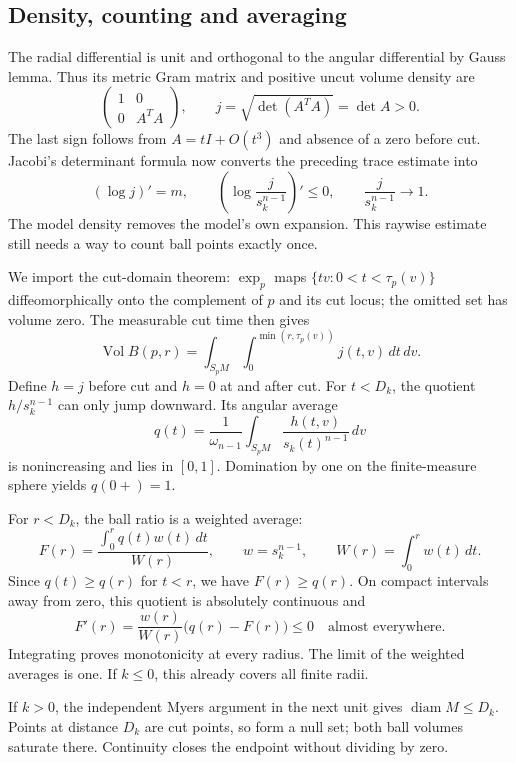 \documentclass[12pt,reqno]{amsart}
\begin{document}
\begin{samepage}
\begin{theorem}
\label{thm:volume}

\end{theorem}
\end{samepage}

\subsection*{Density, counting and averaging}
The radial differential is unit and orthogonal to the angular differential by Gauss lemma. Thus its metric Gram matrix and positive uncut volume density are
\[
\begin{pmatrix}1&0\\0&A^TA\end{pmatrix},
\qquad j=\sqrt{\det(A^TA)}=\det A>0.
\]
The last sign follows from \(A=tI+O(t^3)\) and absence of a zero before cut. Jacobi's determinant formula now converts the preceding trace estimate into
\[
(\log j)'=m,\qquad
\left(\log\frac{j}{s_k^{n-1}}\right)'\le0,
\qquad \frac{j}{s_k^{n-1}}\longrightarrow1.
\]
The model density removes the model's own expansion. This raywise estimate still needs a way to count ball points exactly once.

We import the cut-domain theorem: \(\exp_p\) maps \(\{tv:0<t<\tau_p(v)\}\) diffeomorphically onto the complement of \(p\) and its cut locus; the omitted set has volume zero. The measurable cut time then gives
\[
\operatorname{Vol}B(p,r)=\int_{S_pM}\int_0^{\min(r,\tau_p(v))}j(t,v)\,dt\,dv.
\]
Define \(h=j\) before cut and \(h=0\) at and after cut. For \(t<D_k\), the quotient \(h/s_k^{n-1}\) can only jump downward. Its angular average
\[
q(t)=\frac1{\omega_{n-1}}\int_{S_pM}\frac{h(t,v)}{s_k(t)^{n-1}}\,dv
\]
is nonincreasing and lies in \([0,1]\). Domination by one on the finite-measure sphere yields \(q(0+)=1\).

For \(r<D_k\), the ball ratio is a weighted average:
\[
F(r)=\frac{\int_0^r q(t)w(t)\,dt}{W(r)},
\qquad w=s_k^{n-1},\qquad W(r)=\int_0^r w(t)\,dt.
\]
Since \(q(t)\ge q(r)\) for \(t<r\), we have \(F(r)\ge q(r)\). On compact intervals away from zero, this quotient is absolutely continuous and
\[
F'(r)=\frac{w(r)}{W(r)}\bigl(q(r)-F(r)\bigr)\le0
\quad\text{almost everywhere}.
\]
Integrating proves monotonicity at every radius. The limit of the weighted averages is one. If \(k\le0\), this already covers all finite radii.

If \(k>0\), the independent Myers argument in the next unit gives \(\operatorname{diam}M\le D_k\). Points at distance \(D_k\) are cut points, so form a null set; both ball volumes saturate there. Continuity closes the endpoint without dividing by zero.
\end{document}
